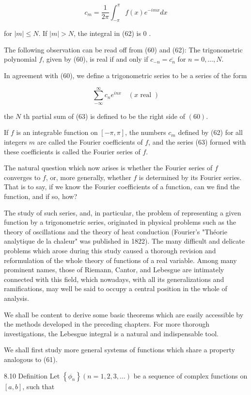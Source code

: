 \documentclass[10pt]{article}
\begin{document}
$$
c_{m}=\frac{1}{2 \pi} \int_{-\pi}^{\pi} f(x) e^{-i m x} d x
$$

for $|m| \leq N$. If $|m|>N$, the integral in (62) is 0 .

The following observation can be read off from (60) and (62): The trigonometric polynomial $f$, given by (60), is real if and only if $c_{-n}=\overline{c_{n}}$ for $n=0, \ldots, N$.

In agreement with (60), we define a trigonometric series to be a series of the form

$$
\sum_{-\infty}^{\infty} c_{n} e^{i n x} \quad(x \text { real })
$$

the $N$ th partial sum of (63) is defined to be the right side of $(60)$.

If $f$ is an integrable function on $[-\pi, \pi]$, the numbers $c_{m}$ defined by (62) for all integers $m$ are called the Fourier coefficients of $f$, and the series (63) formed with these coefficients is called the Fourier series of $f$.

The natural question which now arises is whether the Fourier series of $f$ converges to $f$, or, more generally, whether $f$ is determined by its Fourier series. That is to say, if we know the Fourier coefficients of a function, can we find the function, and if so, how?

The study of such series, and, in particular, the problem of representing a given function by a trigonometric series, originated in physical problems such as the theory of oscillations and the theory of heat conduction (Fourier's "Théorie analytique de la chaleur" was published in 1822). The many difficult and delicate problems which arose during this study caused a thorough revision and reformulation of the whole theory of functions of a real variable. Among many prominent names, those of Riemann, Cantor, and Lebesgue are intimately connected with this field, which nowadays, with all its generalizations and ramifications, may well be said to occupy a central position in the whole of analysis.

We shall be content to derive some basic theorems which are easily accessible by the methods developed in the preceding chapters. For more thorough investigations, the Lebesgue integral is a natural and indispensable tool.

We shall first study more general systems of functions which share a property analogous to (61).

8.10 Definition Let $\left\{\phi_{n}\right\}(n=1,2,3, \ldots)$ be a sequence of complex functions on $[a, b]$, such that
\end{document}
